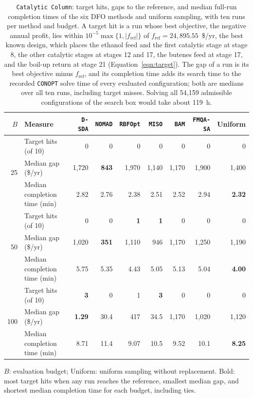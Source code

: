 \documentclass{article}
\begin{document}
\begin{table}[htbp]
\centering
\caption{\texttt{Catalytic Column}: target hits, gaps to the reference, and median full-run completion times of the six DFO methods and uniform sampling, with ten runs per method and budget.
A target hit is a run whose best objective, the negative annual profit, lies within \(10^{-5}\max\{1,|f_{\mathrm{ref}}|\}\) of \(f_{\mathrm{ref}}=24{,}895.55\)~\$/yr, the best known design, which places the ethanol feed and the first catalytic stage at stage 8, the other catalytic stages at stages 12 and 17, the butenes feed at stage 17, and the boil-up return at stage 21 (Equation~\eqref{eqn:target}).
The gap of a run is its best objective minus \(f_{\mathrm{ref}}\), and its completion time adds its search time to the recorded \texttt{CONOPT} solve time of every evaluated configuration; both are medians over all ten runs, including target misses.
Solving all 54,159 admissible configurations of the search box would take about 119~h.}
\label{tab:catdist}
\footnotesize
\setlength{\tabcolsep}{3.5pt}
\begin{threeparttable}
\begin{tabular}{@{}rlrrrrrrr@{}}\toprule
\(B\) & Measure & \texttt{D-SDA} & \texttt{NOMAD} & \texttt{RBFOpt} & \texttt{MISO} & \texttt{BAM} & \texttt{FMQA-SA} & Uniform\\\midrule
\multirow{3}{*}{25} & Target hits (of 10) & 0 & 0 & 0 & 0 & 0 & 0 & 0 \\
 & Median gap (\$/yr) & 1{,}720 & \textbf{843} & 1{,}970 & 1{,}140 & 1{,}170 & 1{,}900 & 1{,}400 \\
 & Median completion time (min) & 2.82 & 2.76 & 2.38 & 2.51 & 2.52 & 2.94 & \textbf{2.32} \\
\midrule
\multirow{3}{*}{50} & Target hits (of 10) & 0 & 0 & \textbf{1} & \textbf{1} & 0 & 0 & 0 \\
 & Median gap (\$/yr) & 1{,}020 & \textbf{351} & 1{,}110 & 946 & 1{,}170 & 1{,}250 & 1{,}190 \\
 & Median completion time (min) & 5.75 & 5.35 & 4.43 & 5.05 & 5.13 & 5.04 & \textbf{4.00} \\
\midrule
\multirow{3}{*}{100} & Target hits (of 10) & \textbf{3} & 0 & 1 & \textbf{3} & 0 & 0 & 0 \\
 & Median gap (\$/yr) & \textbf{1.29} & 30.4 & 417 & 34.5 & 1{,}170 & 1{,}020 & 1{,}120 \\
 & Median completion time (min) & 8.71 & 11.4 & 9.07 & 10.5 & 9.52 & 10.1 & \textbf{8.25} \\
\bottomrule
\end{tabular}
\begin{tablenotes}[flushleft]\footnotesize
\item \(B\): evaluation budget; Uniform: uniform sampling without replacement.
Bold: most target hits when any run reaches the reference, smallest median gap, and shortest median completion time for each budget, including ties.
\end{tablenotes}
\end{threeparttable}
\end{table}
\FloatBarrier
\end{document}
